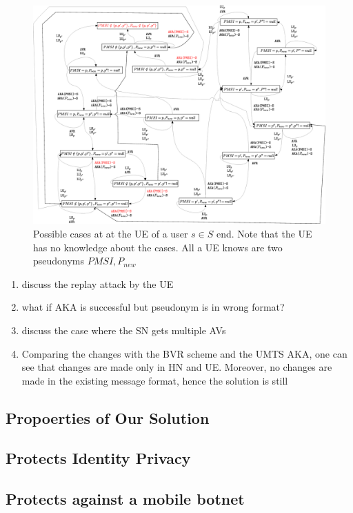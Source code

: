 \documentclass{llncs} %
\begin{document}
\begin{figure}[!tbp]
  \centering
    \includegraphics[width=\textwidth]{UE_diagram.eps}
 \caption{Possible cases at at the UE of a user $s \in S$ end. Note that the UE has no knowledge about the cases. All a UE knows are two pseudonyms $PMSI,P_{new}$}
  \label{fig:ue_diagram}
\end{figure}

\begin{enumerate}
 \item discuss the replay attack by the UE
 \item what if AKA is successful but pseudonym is in wrong format?
 \item discuss the case where the SN gets multiple AVs
 \item Comparing the changes with the BVR scheme and the UMTS AKA, one can see that changes are made only in HN and UE. Moreover, no changes are made in the existing message format, hence the solution is still
\end{enumerate}





\subsection{Propoerties of Our Solution}
\subsection{Protects Identity Privacy}
\subsection{Protects against a mobile botnet}
\end{document}
